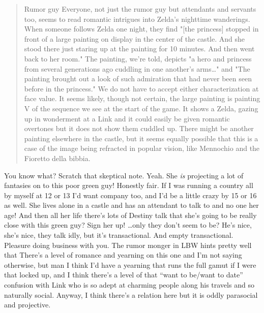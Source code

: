   \begin{quote}Rumor guy
  Everyone, not just the rumor guy but attendants and servants too, seems to read romantic intrigues into Zelda's nighttime wanderings. When someone follows Zelda one night, they find "[the princess] stopped in front of a large painting on display in the center of the castle. And she stood there just staring up at the painting for 10 minutes. And then went back to her room."  
  The painting, we're told, depicts "a hero and princess from several generations ago cuddling in one another’s arms\ldots" and "The painting brought out a look of such admiration that had never been seen before in the princess." We do not have to accept either characterization at face value. It seems likely, though not certain, the large painting is painting V of the sequence we see at the start of the game. It shows a Zelda, gazing up in wonderment at a Link and it could easily be given romantic overtones but it does not show them cuddled up. There might be another painting elsewhere in the castle, but it seems equally possible that this is a case of the image being refracted in popular vision, like Mennochio and the Fioretto della bibbia.\end{quote}


  You know what? Scratch that skeptical note. Yeah. She \emph{is} projecting a lot of fantasies on to this poor green guy! Honestly fair. If I was running a country all by myself at 12 or 13 I'd want company too, and I'd be a little crazy by 15 or 16 as well. She lives alone in a castle and has an attendant to talk to and no one her age!
  And then all her life there's lots of Destiny talk that she's going to be really close with this green guy? Sign her up!
  \ldots only they don't seem to be?
  He's nice, she's nice, they talk idly, but it's transactional.
  And empty transactional. Pleasure doing business with you.
  The rumor monger in LBW hints pretty well that There's a level of romance and yearning on this one and I'm not saying otherwise, but man I think I'd have a yearning that runs the full gamut if I were that locked up, and I think there's a level of that ``want to be/want to date'' confusion with Link who is so adept at charming people along his travels and so naturally social. Anyway, I think there's a relation here but it is oddly parasocial and projective.
